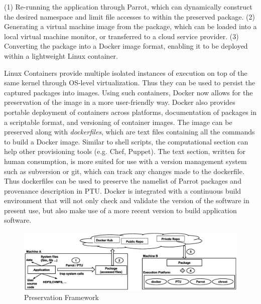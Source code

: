 (1) Re-running the application through Parrot, which can dynamically construct
the desired namespace and limit file accesses to within the preserved package.
(2) Generating a virtual machine image from the package, which can be loaded
into a local virtual machine monitor, or transferred to a cloud service provider.
(3) Converting the package into a Docker image format, enabling it to be
deployed within a lightweight Linux container.

\vspace{5pt}
Linux Containers provide multiple isolated instances of execution on top of the same kernel through OS-level virtualization. Thus they can be used to persist the captured packages into images. Using such containers, Docker now allows for the preservation of the image in a more user-friendly way. Docker also provides portable deployment of containers across platforms, documentation of packages in a scriptable format, and versioning of container images. The image can be preserved along with \emph{dockerfiles}, which are text files containing all the commands to build a Docker image. Similar to shell scripts, the computational section can help other provisioning tools (e.g. Chef, Puppet).  The text section, written for human consumption, is more suited for use with a version management system such as subversion or git, which can track any changes made to the dockerfile. Thus dockerfiles can be used to preserve the namelist of Parrot packages and provenance description in PTU. Docker is integrated with a continuous build environment that will not only check and validate the version of the software in present use, but also make use of a more recent version to build application software.

\begin{figure}
\centering
\includegraphics[width=1.0\textwidth]{preservation_framework.eps}
\caption{Preservation Framework}
\label{fig: preservation_framework}
\end{figure}

